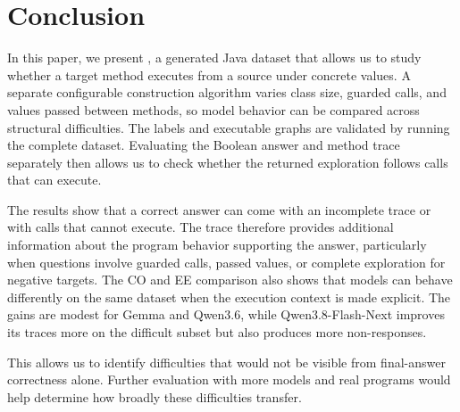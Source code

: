 \section{Conclusion}
\label{sec:conclusion}

In this paper, we present \benchmark, a generated Java dataset that allows us to study whether a target method executes from a source under concrete values. A separate configurable construction algorithm varies class size, guarded calls, and values passed between methods, so model behavior can be compared across structural difficulties. The labels and executable graphs are validated by running the complete dataset. Evaluating the Boolean answer and method trace separately then allows us to check whether the returned exploration follows calls that can execute.

The results show that a correct answer can come with an incomplete trace or with calls that cannot execute. The trace therefore provides additional information about the program behavior supporting the answer, particularly when questions involve guarded calls, passed values, or complete exploration for negative targets. The CO and EE comparison also shows that models can behave differently on the same dataset when the execution context is made explicit. The gains are modest for Gemma and Qwen3.6, while Qwen3.8-Flash-Next improves its traces more on the difficult subset but also produces more non-responses.

This allows us to identify difficulties that would not be visible from final-answer correctness alone. Further evaluation with more models and real programs would help determine how broadly these difficulties transfer.
